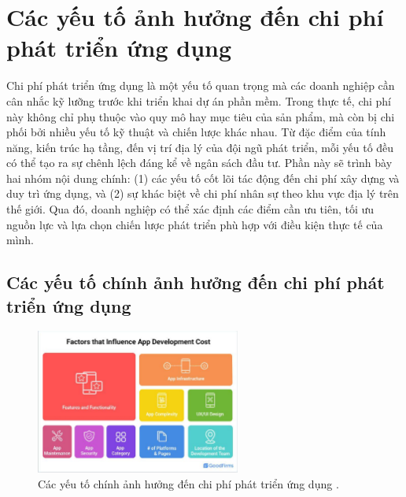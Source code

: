 \section{Các yếu tố ảnh hưởng đến chi phí phát triển ứng dụng}

  Chi phí phát triển ứng dụng là một yếu tố quan trọng mà các doanh nghiệp cần cân nhắc kỹ lưỡng trước khi triển khai dự án phần mềm. Trong thực tế, chi phí này không chỉ phụ thuộc vào quy mô hay mục tiêu của sản phẩm, mà còn bị chi phối bởi nhiều yếu tố kỹ thuật và chiến lược khác nhau. Từ đặc điểm của tính năng, kiến trúc hạ tầng, đến vị trí địa lý của đội ngũ phát triển, mỗi yếu tố đều có thể tạo ra sự chênh lệch đáng kể về ngân sách đầu tư. Phần này sẽ trình bày hai nhóm nội dung chính: (1) các yếu tố cốt lõi tác động đến chi phí xây dựng và duy trì ứng dụng, và (2) sự khác biệt về chi phí nhân sự theo khu vực địa lý trên thế giới. Qua đó, doanh nghiệp có thể xác định các điểm cần ưu tiên, tối ưu nguồn lực và lựa chọn chiến lược phát triển phù hợp với điều kiện thực tế của mình.

  
  
\subsection{Các yếu tố chính ảnh hưởng đến chi phí phát triển ứng dụng}
\renewcommand{\labelitemi}{--}  

  \begin{figure}[H]
    \centering
    \includegraphics[width=0.6\textwidth]{images/appCosst.png}
    \caption{Các yếu tố chính ảnh hưởng đến chi phí phát triển ứng dụng \cite{goodfirmsAppCost}.}
    \label{fig:fig20}
  \end{figure}

